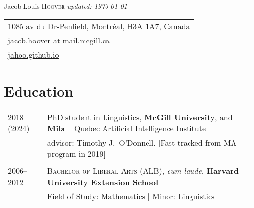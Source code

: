 \documentclass[11pt,a4paper]{article}
\begin{document}
\pagestyle{empty}
\Huge{Jacob Louis \scshape{Hoover}}
\small\textit{\hfill updated: \today}

\begin{tabular}{l}
  1085 av du Dr-Penfield, Montréal, H3A 1A7, Canada\\
  jacob.hoover at mail.mcgill.ca\\
  \href{http://jahoo.github.io}{jahoo.github.io}
\end{tabular}
\vspace*{10pt}

\section{Education}

\begin{longtable}{p{1.7cm}|p{15cm}}
  2018--(2024)%
    &%
    PhD student in Linguistics,
    \textbf{\href{https://www.mcgill.ca/linguistics/graduate}{McGill} University}, and
    \href{http://mila.quebec}{\textbf{Mila}} -- Quebec Artificial Intelligence
    Institute\\
    &%
    advisor: Timothy J.\ O'Donnell. [Fast-tracked from MA program in 2019]\\
    \multicolumn{2}{c}{}\\
  2006--2012%
    &%
    \textsc{Bachelor of Liberal Arts (ALB)}, \emph{cum laude},
    \textbf{Harvard University \href{https://extension.harvard.edu/}{Extension School}}\\
    &%
    Field of Study: Mathematics | Minor: Linguistics\\
  \end{longtable}
\end{document}
